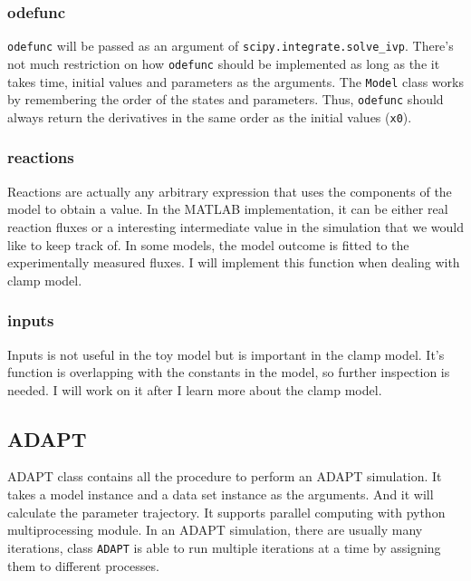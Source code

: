 \hypertarget{odefunc}{%
\subsubsection{odefunc}\label{odefunc}}

\texttt{odefunc} will be passed as an argument of
\texttt{scipy.integrate.solve\_ivp}. There's not much restriction on how
\texttt{odefunc} should be implemented as long as the it takes time,
initial values and parameters as the arguments. The \texttt{Model} class
works by remembering the order of the states and parameters. Thus,
\texttt{odefunc} should always return the derivatives in the same order
as the initial values (\texttt{x0}).

\hypertarget{reactions}{%
\subsubsection{reactions}\label{reactions}}

Reactions are actually any arbitrary expression that uses the components
of the model to obtain a value. In the MATLAB implementation, it can be
either real reaction fluxes or a interesting intermediate value in the
simulation that we would like to keep track of. In some models, the
model outcome is fitted to the experimentally measured fluxes. I will
implement this function when dealing with clamp model.

\hypertarget{inputs}{%
\subsubsection{inputs}\label{inputs}}

Inputs is not useful in the toy model but is important in the clamp
model. It's function is overlapping with the constants in the model, so
further inspection is needed. I will work on it after I learn more about
the clamp model.

\hypertarget{adapt}{%
\subsection{ADAPT}\label{adapt}}

ADAPT class contains all the procedure to perform an ADAPT simulation.
It takes a model instance and a data set instance as the arguments. And
it will calculate the parameter trajectory. It supports parallel
computing with python multiprocessing module. In an ADAPT simulation,
there are usually many iterations, class \texttt{ADAPT} is able to run
multiple iterations at a time by assigning them to different processes.
